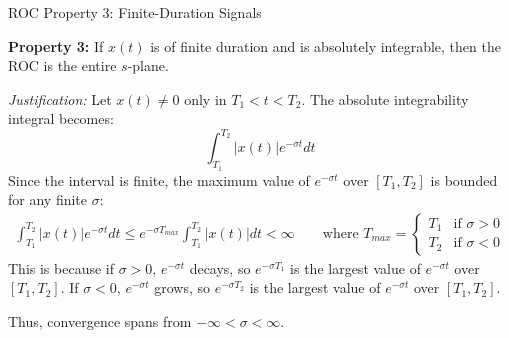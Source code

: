\begin{frame}{ROC Property 3: Finite-Duration Signals}
    \begin{tcolorbox}[colframe=PrimaryColor, colback=PrimaryColor!10]
        \textbf{Property 3:} If $x(t)$ is of finite duration and is absolutely integrable, then the ROC is the entire $s$-plane.
    \end{tcolorbox}
    \vspace{0.2cm}
    \textit{Justification:} Let $x(t) \neq 0$ only in $T_1 < t < T_2$. The absolute integrability integral becomes:
    \begin{equation*}
        \int_{T_1}^{T_2} |x(t)| e^{-\sigma t} dt
    \end{equation*}
    Since the interval is finite, the maximum value of $e^{-\sigma t}$ over $[T_1, T_2]$ is bounded for any finite $\sigma$:
    \begin{align*}
        \int_{T_1}^{T_2} |x(t)| e^{-\sigma t} dt \le e^{-\sigma T_{max}} \int_{T_1}^{T_2} |x(t)| dt < \infty
        \qquad \text{where } T_{max} = \begin{cases}
                                           T_1 & \text{if } \sigma > 0 \\
                                           T_2 & \text{if } \sigma < 0
                                       \end{cases}
    \end{align*}
    This is because if $\sigma > 0$, $e^{-\sigma t}$ decays, so $e^{-\sigma T_1}$ is the largest value of $e^{-\sigma t}$ over $[T_1, T_2]$.
    If $\sigma < 0$, $e^{-\sigma t}$ grows, so $e^{-\sigma T_2}$ is the largest value of $e^{-\sigma t}$ over $[T_1, T_2]$.

    Thus, convergence spans from $-\infty < \sigma < \infty$.
\end{frame}

